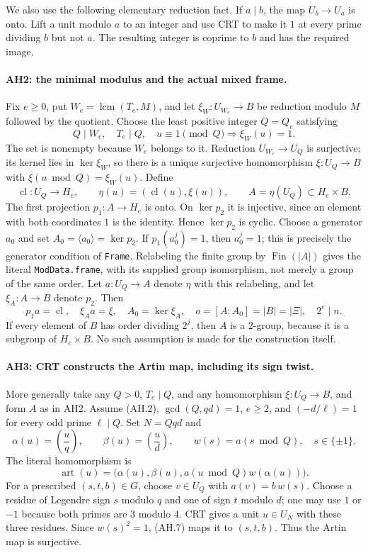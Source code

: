 We also use the following elementary reduction fact. If $a\mid b$,
the map $U_b\to U_a$ is onto. Lift a unit modulo $a$ to an integer and
use CRT to make it $1$ at every prime dividing $b$ but not $a$.
The resulting integer is coprime to $b$ and has the required image.

\paragraph{AH2: the minimal modulus and the actual mixed frame.}
Fix $e\ge0$, put $W_e=\operatorname{lcm}(T_e,M)$, and let
$\xi_W:U_{W_e}\to B$ be reduction modulo $M$ followed by the quotient.
Choose the least positive integer $Q=Q_e$ satisfying
\[
 Q\mid W_e,\quad T_e\mid Q,\quad
 u\equiv1\pmod Q\Longrightarrow\xi_W(u)=1.       \tag{AH.4}
\]
The set is nonempty because $W_e$ belongs to it. Reduction $U_{W_e}\to U_Q$
is surjective; its kernel lies in $\ker\xi_W$, so there is a unique
surjective homomorphism $\xi:U_Q\to B$ with
$\xi(u\bmod Q)=\xi_W(u)$. Define
\[
 \operatorname{cl}:U_Q\longrightarrow H_e,
 \qquad \eta(u)=(\operatorname{cl}(u),\xi(u)),
 \qquad A=\eta(U_Q)\subset H_e\times B.          \tag{AH.5}
\]
The first projection $p_1:A\to H_e$ is onto. On $\ker p_2$ it is
injective, since an element with both coordinates $1$ is the identity.
Hence $\ker p_2$ is cyclic. Choose a generator $a_0$ and set
$A_0=\langle a_0\rangle=\ker p_2$. If $p_1(a_0^j)=1$, then $a_0^j=1$;
this is precisely the generator condition of \texttt{Frame}.
Relabeling the finite group by $\operatorname{Fin}(|A|)$ gives the literal
\texttt{ModData.frame}, with its supplied group isomorphism, not merely a
group of the same order. Let $a:U_Q\to A$ denote $\eta$ with this relabeling,
and let $\xi_A:A\to B$ denote $p_2$. Then
\[
 p_1a=\operatorname{cl},\quad \xi_Aa=\xi,
 \quad A_0=\ker\xi_A,
 \quad o=[A:A_0]=|B|=|\Xi|,
 \quad 2^e\mid n.                              \tag{AH.6}
\]
If every element of $B$ has order dividing $2^j$, then $A$ is a $2$-group,
because it is a subgroup of $H_e\times B$. No such assumption is made
for the construction itself.

\paragraph{AH3: CRT constructs the Artin map, including its sign twist.}
More generally take any $Q>0$, $T_e\mid Q$, and any homomorphism
$\xi:U_Q\to B$, and form $A$ as in AH2. Assume (AH.2),
$\gcd(Q,qd)=1$, $e\ge2$, and
$(-d/\ell)=1$ for every odd prime $\ell\mid Q$.
Set $N=Qqd$ and
\[
 \alpha(u)=\left(\frac{u}{q}\right),\qquad
 \beta(u)=\left(\frac{u}{d}\right),\qquad
 w(s)=a(s\bmod Q),\quad s\in\{\pm1\}.
\]
The literal homomorphism is
\[
 \operatorname{art}(u)=
 \bigl(\alpha(u),\beta(u),a(u\bmod Q)w(\alpha(u))\bigr).
                                                               \tag{AH.7}
\]
For a prescribed $(s,t,b)\in G$, choose $v\in U_Q$ with
$a(v)=b\,w(s)$. Choose a residue of Legendre sign $s$ modulo $q$ and
one of sign $t$ modulo $d$; one may use $1$ or $-1$ because both primes
are $3$ modulo $4$. CRT gives a unit $u\in U_N$ with these three
residues. Since $w(s)^2=1$, (AH.7) maps it to $(s,t,b)$.
Thus the Artin map is surjective.

